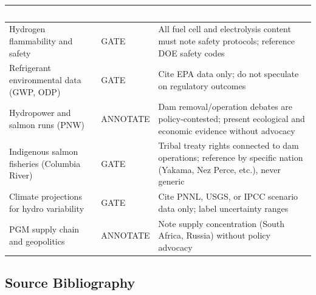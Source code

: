 \documentclass[11pt,letterpaper]{article}
\newcommand{\tableheader}[1]{\textbf{\sffamily\textcolor{white}{#1}}}
\begin{document}
\begin{center}
\begin{tabularx}{\textwidth}{L{4cm}L{2cm}X}
\toprule
{}
\tableheader{Consideration} & \tableheader{Type} & \tableheader{Handling Requirement} \\
\midrule
Hydrogen flammability and safety & GATE & All fuel cell and electrolysis content must note safety protocols; reference DOE safety codes \\
Refrigerant environmental data (GWP, ODP) & GATE & Cite EPA data only; do not speculate on regulatory outcomes \\
Hydropower and salmon runs (PNW) & ANNOTATE & Dam removal/operation debates are policy-contested; present ecological and economic evidence without advocacy \\
Indigenous salmon fisheries (Columbia River) & GATE & Tribal treaty rights connected to dam operations; reference by specific nation (Yakama, Nez Perce, etc.), never generic \\
Climate projections for hydro variability & GATE & Cite PNNL, USGS, or IPCC scenario data only; label uncertainty ranges \\
PGM supply chain and geopolitics & ANNOTATE & Note supply concentration (South Africa, Russia) without policy advocacy \\
\bottomrule
\end{tabularx}
\end{center}

\subsection{Source Bibliography}
\end{document}

